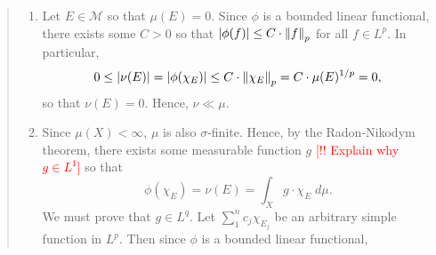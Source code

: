 \documentclass{article}
\begin{document}
\begin{itemize}
\begin{quote}
\begin{solutions}
\begin{enumerate}[itemsep =-2pt,label = (\arabic{*})]
\begin{equation}
		\end{equation}
		For each positive integer $n > 0$, define the sum 
			\begin{equation}
				S_{n} = \sum_{1}^{n}\chi_{E_{j}} = \chi_{\bigcup_{1}^{n}E_{j}}. 
			\end{equation}
		We observe that 
			\begin{align}
				\begin{split}
					\norm{\chi_{\bigcup^{\infty}E_{j}} - S_{n}}_{p} &=  \norm{ \sum_{j > n}\chi_{E_{j}} }_{p} \\
					&= \left(\sum_{j > n}\mu(E_{j})\right)^{1/p}. 
				\end{split}
			\end{align}
		We know that since $\mu$ is finite, $\sum_{1}^{\infty}\mu(E_{j})$ converges. And therefore, the tail of this sum must decay. Hence, 
			\begin{equation}
				\sum_{j > n}\mu(E_{j}) \longrightarrow 0 \text{ as $n \to \infty$}, 
			\end{equation}
		which proves that $S_{n} \to \chi_{\bigcup^{\infty}E_{j}}$ in the $L^{p}$-norm. Since $\phi$ is continuous, we conclude that 
		\begin{equation}
			\sum_{1}^{\infty}\nu(E_{j}) \longleftarrow \sum_{1}^{n}\nu(E_{j}) = \nu\left(\bigcup_{1}^{n}E_{j}\right) = \phi\left(\chi_{S_{n}}\right) \longrightarrow \phi(\chi_{\bigcup^{\infty}E_{j}}) = \nu\left(\bigcup_{1}^{\infty}E_{j}\right).
		\end{equation}
		Hence, this concludes the proof that $\nu$ is a complex measure.
		\item Let $E \in \mathscr{M}$ so that $\mu(E) = 0$. Since $\phi$ is a bounded linear functional, there exists some $C > 0$ so that $|\phi(f)| \leq C\cdot \left\Vert f \right\Vert_{p}$ for all $f \in L^{p}$. In particular, 
		\begin{equation}
			0 \leq |\nu(E)| = |\phi(\chi_{E})| \leq C \cdot \left\Vert \chi_{E} \right\Vert_{p} = C \cdot \mu(E)^{1/p} = 0,
		\end{equation}
	so that $\nu(E) = 0$. Hence, $\nu \ll \mu$. 
	\item Since $\mu(X) < \infty$, $\mu$ is also $\sigma$-finite. Hence, by the Radon-Nikodym theorem, there exists some measurable function $g$ \textcolor{red}{[!! Explain why $g \in L^{1}$]} so that 
		\begin{equation}
			\phi(\chi_{E}) = \nu(E) =\int_{X}g\cdot \chi_{E}\;d\mu. 
		\end{equation}
	We must prove that $g \in L^{q}$. Let $\sum_{1}^{n}c_{j}\chi_{E_{j}}$ be an arbitrary simple function in $L^{p}$. Then since $\phi$ is a bounded linear functional, 

\end{enumerate}
\end{solutions}
\end{quote}
\end{itemize}
\end{document}
